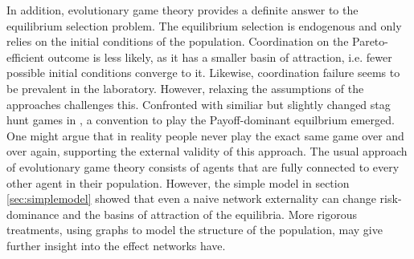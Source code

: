 In addition, evolutionary game theory provides a definite answer to
the equilibrium selection problem. The equilibrium selection is endogenous 
and only relies on the initial conditions of the population. 
Coordination on the Pareto-efficient outcome is less likely, as it 
has a smaller basin of attraction, i.e. fewer possible initial conditions
converge to it. Likewise, coordination failure seems to be prevalent in 
the laboratory. 
However, relaxing the assumptions of the approaches challenges this.
Confronted with similiar but slightly changed stag hunt games in 
\textcite{rankin_strategic_2000}, a convention to play the Payoff-dominant 
equilbrium emerged. One might argue that in reality people never play 
the exact same game over and over again, supporting the external validity
of this approach.
The usual approach of evolutionary game theory consists of agents that are 
fully connected to every other agent in their population. However,
the simple model in section \ref{sec:simplemodel} showed that 
even a naive network externality can change risk-dominance and the basins
of attraction of the equilibria. More rigorous treatments, using graphs to
model the structure of the population, may give further insight into the 
effect networks have.






